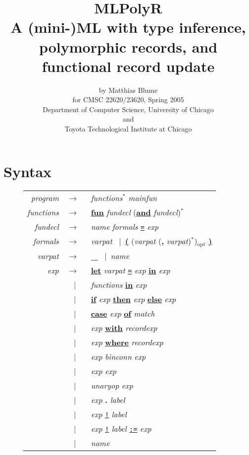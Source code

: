\documentclass{article}
\title{{\bf MLPolyR} \\
A (mini-)ML with type inference, polymorphic records, and functional record update }
\author{by Matthias Blume \\
for CMSC 22620/23620, Spring 2005 \\
{\small Department of Computer Science, University of Chicago} \\
{\tiny and} \\
{\small Toyota Technological Institute at Chicago}}
\date{}
\newcommand{\nt}[1]{{\it #1}}
\newcommand{\tl}[1]{{\underline{\bf #1}}}
\newcommand{\nutl}[1]{{\bf #1}}
\newcommand{\ttl}[1]{{\underline{\tt #1}}}
\newcommand{\ar}{$\rightarrow$\ }
\newcommand{\vb}{~$|$~}
\newcommand{\seq}[1]{{#1}$^{*}$}
\newcommand{\opt}[1]{{#1}$_{\mathrm{opt}}$}
\begin{document}
\maketitle

\section{Syntax}

\begin{figure}
\begin{center}
\begin{tabular}{rcl}
\nt{program}       &\ar& \seq{\nt{functions}} \nt{mainfun} \\
\nt{functions}     &\ar& \tl{fun} \nt{fundecl} \seq{(\tl{and} \nt{fundecl})} \\
\nt{fundecl}       &\ar& \nt{name} \nt{formals} \ttl{=} \nt{exp} \\
\nt{formals}       &\ar& \nt{varpat}
                     \vb \tl{(} \opt{(\nt{varpat}
                                      \seq{(\nutl{,} \nt{varpat})})}
                         \tl{)} \\
\nt{varpat}        &\ar& \nutl{\_} \vb \nt{name} \\
\nt{exp}           &\ar& \tl{let} \nt{varpat} \ttl{=} \nt{exp}
                         \tl{in} \nt{exp} \\
                   &\vb& \nt{functions} \tl{in} \nt{exp} \\
                   &\vb& \tl{if} \nt{exp} \tl{then} \nt{exp}
                                          \tl{else} \nt{exp} \\
                   &\vb& \tl{case} \nt{exp} \tl{of} \nt{match} \\
                   &\vb& \nt{exp} \tl{with} \nt{recordexp} \\
                   &\vb& \nt{exp} \tl{where} \nt{recordexp} \\
                   &\vb& \nt{exp} \nt{binconn} \nt{exp} \\
                   &\vb& \nt{exp} \nt{exp} \\
                   &\vb& \nt{unaryop} \nt{exp} \\
                   &\vb& \nt{exp} \nutl{.} \nt{label} \\
                   &\vb& \nt{exp} \ttl{!} \nt{label} \\
                   &\vb& \nt{exp} \ttl{!} \nt{label} \ttl{:=} \nt{exp} \\
                   &\vb& \nt{name} \\

\end{tabular}
\end{center}
\end{figure}
\end{document}
